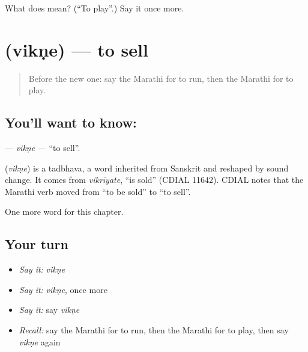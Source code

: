 \begin{tcolorbox}[breakable,colback=teal!4,colframe=teal!35!black,title={Before you move on}]
What does  mean? (\textquotedblleft{}To play\textquotedblright{}.) Say it once more.
\end{tcolorbox}
\section[\texorpdfstring{\mr{विकणे} (vikṇe)}{विकणे (vikṇe)}]{ (vikṇe) — to sell}

\label{lesson:MR-C78-vikne}



\begin{quote}
Before the new one: say the Marathi for to run, then the Marathi for to play.
\end{quote}

\subsection*{You'll want to know: }
\textbf{} — \emph{vikṇe} — \textquotedblleft{}to sell\textquotedblright{}.

\begin{cousinweb}
\textbf{} (\emph{vikṇe}) is a tadbhava, a word inherited from Sanskrit and reshaped by sound change. It comes from \emph{vikrīyate}, \textquotedblleft{}is sold\textquotedblright{} (CDIAL 11642). CDIAL notes that the Marathi verb moved from \textquotedblleft{}to be sold\textquotedblright{} to \textquotedblleft{}to sell\textquotedblright{}.
\end{cousinweb}

\begin{grammarlens}[title={What you've built}]
One more word for this chapter.
\end{grammarlens}

\subsection*{Your turn}
\begin{itemize}
\raggedright
  \item \emph{Say it:} \emph{vikṇe}
  \item \emph{Say it:} \emph{vikṇe}, once more
  \item \emph{Say it:} say \emph{vikṇe}
  \item \emph{Recall:} say the Marathi for to run, then the Marathi for to play, then say \emph{vikṇe} again
\end{itemize}

